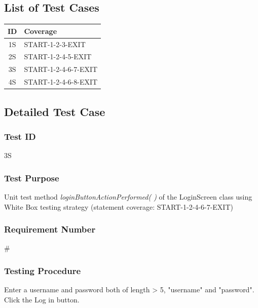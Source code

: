 \documentclass{article}
\begin{document}
\subsection{List of Test Cases}
\begin{center}
  \begin{tabular}{| c | l |}
    \hline
    ID & Coverage\\
    \hline
    1S & START-1-2-3-EXIT\\
    2S & START-1-2-4-5-EXIT\\
    3S & START-1-2-4-6-7-EXIT\\
    4S & START-1-2-4-6-8-EXIT\\
    \hline
  \end{tabular}
\end{center}

\subsection{Detailed Test Case}
\subsubsection{Test ID}
3S

\subsubsection{Test Purpose}
Unit test method \textit{loginButtonActionPerformed( )} of the LoginScreen class using White Box testing strategy (statement coverage: START-1-2-4-6-7-EXIT)

\subsubsection{Requirement Number}
\#

\subsubsection{Testing Procedure}
Enter a username and password both of length > 5, "username" and "password".  Click the Log in button.
\end{document}
